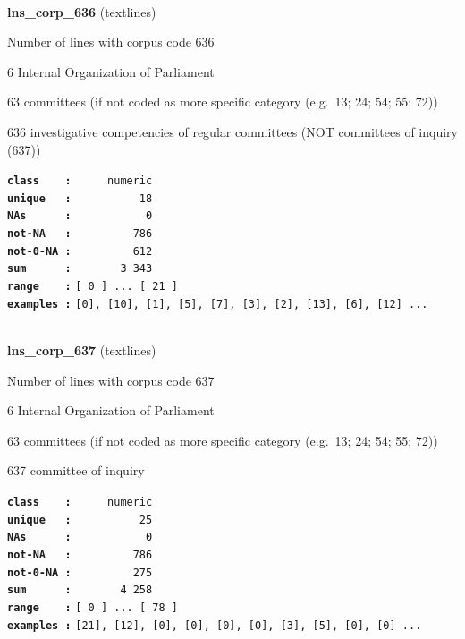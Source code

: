 \documentclass[]{article}
\begin{document}
~

\textbf{lns\_corp\_636} (textlines)

Number of lines with corpus code 636

6 Internal Organization of Parliament

63 committees (if not coded as more specific category (e.g.~13; 24; 54;
55; 72))

636 investigative competencies of regular committees (NOT committees of
inquiry (637))

\textbf{\texttt{class\ \ \ \ :}} \texttt{~~~~~numeric}\\
\textbf{\texttt{unique\ \ \ :}} \texttt{~~~~~~~~~~18}\\
\textbf{\texttt{NAs\ \ \ \ \ \ :}} \texttt{~~~~~~~~~~~0}\\
\textbf{\texttt{not-NA\ \ \ :}} \texttt{~~~~~~~~~786}\\
\textbf{\texttt{not-0-NA\ :}} \texttt{~~~~~~~~~612}\\
\textbf{\texttt{sum\ \ \ \ \ \ :}} \texttt{~~~~~~~3~343}\\
\textbf{\texttt{range\ \ \ \ :}}
\texttt{{[}\ 0\ {]}\ ...\ {[}\ 21\ {]}}\\
\textbf{\texttt{examples\ :}}
\texttt{{[}0{]},\ {[}10{]},\ {[}1{]},\ {[}5{]},\ {[}7{]},\ {[}3{]},\ {[}2{]},\ {[}13{]},\ {[}6{]},\ {[}12{]}\ ...}\\

~

\textbf{lns\_corp\_637} (textlines)

Number of lines with corpus code 637

6 Internal Organization of Parliament

63 committees (if not coded as more specific category (e.g.~13; 24; 54;
55; 72))

637 committee of inquiry

\textbf{\texttt{class\ \ \ \ :}} \texttt{~~~~~numeric}\\
\textbf{\texttt{unique\ \ \ :}} \texttt{~~~~~~~~~~25}\\
\textbf{\texttt{NAs\ \ \ \ \ \ :}} \texttt{~~~~~~~~~~~0}\\
\textbf{\texttt{not-NA\ \ \ :}} \texttt{~~~~~~~~~786}\\
\textbf{\texttt{not-0-NA\ :}} \texttt{~~~~~~~~~275}\\
\textbf{\texttt{sum\ \ \ \ \ \ :}} \texttt{~~~~~~~4~258}\\
\textbf{\texttt{range\ \ \ \ :}}
\texttt{{[}\ 0\ {]}\ ...\ {[}\ 78\ {]}}\\
\textbf{\texttt{examples\ :}}
\texttt{{[}21{]},\ {[}12{]},\ {[}0{]},\ {[}0{]},\ {[}0{]},\ {[}0{]},\ {[}3{]},\ {[}5{]},\ {[}0{]},\ {[}0{]}\ ...}\\
\end{document}
